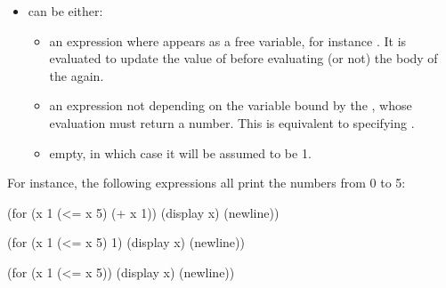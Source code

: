 \begin{exe}[4.9]
\begin{itemize}
\begin{itemize}
\begin{itemize}
                        \item an expression where  appears as a free 
                            variable, for instance . The body 
                            of the  is evaluated as long as the 
                            evaluation of this expression with the current value 
                            of  returns .
                        \item an expression not depending on the variable bound 
                            by the , whose evaluation must return 
                            a number. This is equivalent to either
                             or
                            , depending on whether 
                            the returned value is greater or smaller than the 
                            initial value.
                    \end{itemize}
                \item {} can be either:
                    \begin{itemize}
                        \item an expression where  appears as a free 
                            variable, for instance . It is 
                            evaluated to update the value of  before 
                            evaluating (or not) the body of the  
                            again.
                        \item an expression not depending on the variable bound 
                            by the , whose evaluation must return 
                            a number. This is equivalent to specifying
                            .
                        \item empty, in which case it will be assumed to be 1.
                    \end{itemize}
            \end{itemize}
            For instance, the following expressions all print the numbers from 
            0 to 5:
            \begin{cscm}
                (for (x 1 (<= x 5) (+ x 1)) (display x) (newline))

                (for (x 1 (<= x 5) 1) (display x) (newline))

                (for (x 1 (<= x 5)) (display x) (newline))


\end{cscm}
\end{itemize}
\end{exe}

